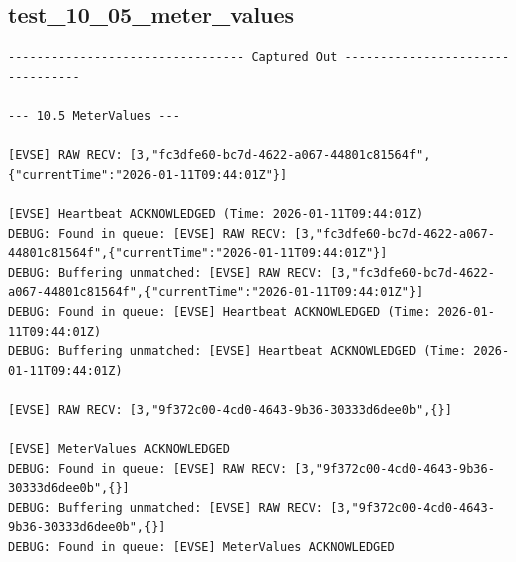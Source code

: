 \documentclass{article}
\begin{document}
\subsection*{test\_10\_05\_meter\_values}
\begin{lstlisting}
--------------------------------- Captured Out ---------------------------------

--- 10.5 MeterValues ---

[EVSE] RAW RECV: [3,"fc3dfe60-bc7d-4622-a067-44801c81564f",{"currentTime":"2026-01-11T09:44:01Z"}]

[EVSE] Heartbeat ACKNOWLEDGED (Time: 2026-01-11T09:44:01Z)
DEBUG: Found in queue: [EVSE] RAW RECV: [3,"fc3dfe60-bc7d-4622-a067-44801c81564f",{"currentTime":"2026-01-11T09:44:01Z"}]
DEBUG: Buffering unmatched: [EVSE] RAW RECV: [3,"fc3dfe60-bc7d-4622-a067-44801c81564f",{"currentTime":"2026-01-11T09:44:01Z"}]
DEBUG: Found in queue: [EVSE] Heartbeat ACKNOWLEDGED (Time: 2026-01-11T09:44:01Z)
DEBUG: Buffering unmatched: [EVSE] Heartbeat ACKNOWLEDGED (Time: 2026-01-11T09:44:01Z)

[EVSE] RAW RECV: [3,"9f372c00-4cd0-4643-9b36-30333d6dee0b",{}]

[EVSE] MeterValues ACKNOWLEDGED
DEBUG: Found in queue: [EVSE] RAW RECV: [3,"9f372c00-4cd0-4643-9b36-30333d6dee0b",{}]
DEBUG: Buffering unmatched: [EVSE] RAW RECV: [3,"9f372c00-4cd0-4643-9b36-30333d6dee0b",{}]
DEBUG: Found in queue: [EVSE] MeterValues ACKNOWLEDGED
\end{lstlisting}
\end{document}
